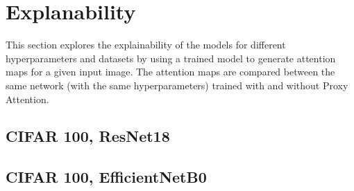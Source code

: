 \section{Explanability}
This section explores the explainability of the models for different hyperparameters and datasets by using a trained model to generate attention maps for a given input image. The attention maps are compared between the same network (with the same hyperparameters) trained with and without Proxy Attention.

\subsection{CIFAR 100, ResNet18}


\subsection{CIFAR 100, EfficientNetB0}
